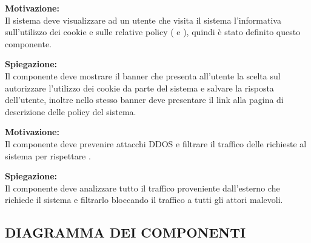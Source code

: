 \begin{listaPersonale}[ACI]{}

    \textbf{Motivazione:}\\
    Il sistema deve visualizzare ad un utente che visita il sistema l'informativa sull'utilizzo dei cookie e sulle relative policy ( e ), quindi è stato definito questo componente.

    \textbf{Spiegazione:}\\
    Il componente deve mostrare il banner che presenta all'utente la scelta sul autorizzare l'utilizzo dei cookie da parte del sistema e salvare la risposta dell'utente, inoltre nello stesso banner deve presentare il link alla pagina di descrizione delle policy del sistema.


    \textbf{Motivazione:}\\
    Il componente deve prevenire attacchi DDOS e filtrare il traffico delle richieste al sistema per rispettare .

    \textbf{Spiegazione:}\\
    Il componente deve analizzare tutto il traffico proveniente dall'esterno che richiede il sistema e filtrarlo bloccando il traffico a tutti gli attori malevoli.
\end{listaPersonale}






































\subsection{DIAGRAMMA DEI COMPONENTI}

